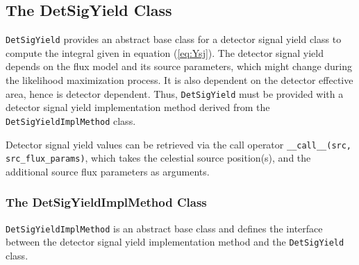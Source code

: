 \documentclass{article}
\newcommand{\eq}[1]{(\ref{#1})}
\newcommand{\code}[1]{\texttt{#1}}
\newcommand{\class}[1]{\colorbox{blue!30}{\code{#1}}}
\begin{document}
\subsection{The DetSigYield Class}

\class{DetSigYield} provides an abstract base class for a detector signal yield
class to compute the integral given in equation \eq{eq:Ysj}. The detector signal
yield depends on the flux model and its source parameters, which might
change during the likelihood maximization process. It is also dependent on the
detector effective area, hence is detector dependent. Thus,
\class{DetSigYield} must be provided with a detector signal
yield implementation method derived from the \class{DetSigYieldImplMethod}
class.

Detector signal yield values can be retrieved via the call operator
\code{\_\_call\_\_(src, src\_flux\_params)}, which takes the celestial source
position(s), and the additional source flux parameters as arguments.

\subsubsection{The DetSigYieldImplMethod Class}

\class{DetSigYieldImplMethod} is an abstract base class and defines the interface
between the detector signal yield implementation method and the
\class{DetSigYield} class.
\end{document}
